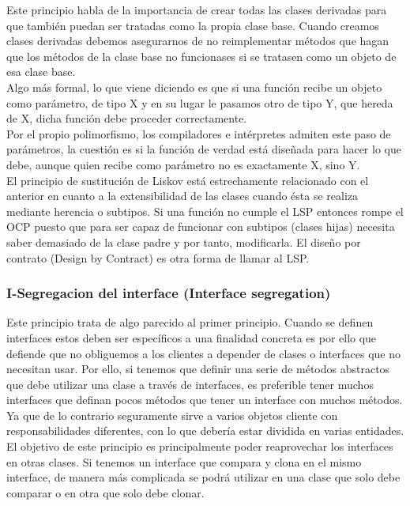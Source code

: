\documentclass[../pfc.tex]{subfiles}
\begin{document}
	Este principio habla de la importancia de crear todas las clases derivadas para que también puedan ser tratadas como la propia clase base. Cuando creamos clases derivadas debemos asegurarnos de no reimplementar métodos que hagan que los métodos de la clase base no funcionases si se tratasen como un objeto de esa clase base.\\
	
	Algo más formal, lo que viene diciendo es que si una función recibe un objeto como parámetro, de tipo X y en su lugar le pasamos otro de tipo Y, que hereda de X, dicha función debe proceder correctamente.\\
	
	Por el propio polimorfismo, los compiladores e intérpretes admiten este paso de parámetros, la cuestión es si la función de verdad está diseñada para hacer lo que debe, aunque quien recibe como parámetro no es exactamente X, sino Y.\\
	
	El principio de sustitución de Liskov está estrechamente relacionado con el anterior en cuanto a la extensibilidad de las clases cuando ésta se realiza mediante herencia o subtipos. Si una función no cumple el LSP entonces rompe el OCP puesto que para ser capaz de funcionar con subtipos (clases hijas) necesita saber demasiado de la clase padre y por tanto, modificarla. El diseño por contrato (Design by Contract) es otra forma de llamar al LSP.\\
	
	
	\subsubsection{I-Segregacion del interface (Interface segregation)}
	
	Este principio trata de algo parecido al primer principio. Cuando se definen interfaces estos deben ser específicos a una finalidad concreta es por ello que defiende que no obliguemos a los clientes a depender de clases o interfaces que no necesitan usar. Por ello, si tenemos que definir una serie de métodos abstractos que debe utilizar una clase a través de interfaces, es preferible tener muchos interfaces que definan pocos métodos que tener un interface con muchos métodos. Ya que de lo contrario seguramente sirve a varios objetos cliente con responsabilidades diferentes, con lo que debería estar dividida en varias entidades.\\
	
	El objetivo de este principio es principalmente poder reaprovechar los interfaces en otras clases. Si tenemos un interface que compara y clona en el mismo interface, de manera más complicada se podrá utilizar en una clase que solo debe comparar o en otra que solo debe clonar.\\
	
\end{document}

